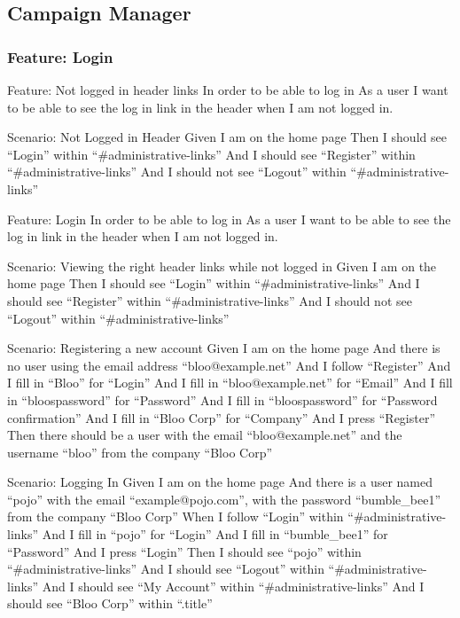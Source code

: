 \documentclass[12pt]{article}
\begin{document}
\subsection{Campaign Manager}

\subsubsection{Feature: Login}

\begin{hangparas}{0.25in}{1}
Feature: Not logged in header links 
In order to be able to log in 
As a user 
I want to be able to see the log in link in the header when I am not logged in. 

Scenario: Not Logged in Header  
Given I am on the home page 
Then I should see ``Login'' within ``\#administrative-links'' 
And I should see ``Register'' within ``\#administrative-links'' 
And I should not see ``Logout'' within ``\#administrative-links'' 

Feature: Login 
  In order to be able to log in 
  As a user 
  I want to be able to see the log in link in the header when I am not logged in. 

Scenario: Viewing the right header links while not logged in  
  Given I am on the home page 
  Then I should see ``Login'' within ``\#administrative-links'' 
  And I should see ``Register'' within ``\#administrative-links'' 
  And I should not see ``Logout'' within ``\#administrative-links'' 


Scenario: Registering a new account 
Given I am on the home page 
And there is no user using the email address ``bloo@example.net'' 
And I follow ``Register'' 
And I fill in ``Bloo'' for ``Login'' 
And I fill in ``bloo@example.net'' for ``Email'' 
And I fill in ``bloospassword'' for ``Password'' 
And I fill in ``bloospassword'' for ``Password confirmation'' 
And I fill in ``Bloo Corp'' for ``Company'' 
And I press ``Register'' 
Then there should be a user with the email ``bloo@example.net'' and the username ``bloo'' from the company ``Bloo Corp'' 

Scenario: Logging In 
Given I am on the home page 
And there is a user named ``pojo'' with the email ``example@pojo.com'', with the password ``bumble\_bee1'' from the company ``Bloo Corp'' 
When I follow ``Login'' within ``\#administrative-links'' 
And I fill in ``pojo'' for ``Login'' 
And I fill in ``bumble\_bee1'' for ``Password'' 
And I press ``Login'' 
Then I should see ``pojo'' within ``\#administrative-links'' 
And I should see ``Logout'' within ``\#administrative-links'' 
And I should see ``My Account'' within ``\#administrative-links'' 
And I should see ``Bloo Corp'' within ``.title'' 


\end{hangparas}
\end{document}
